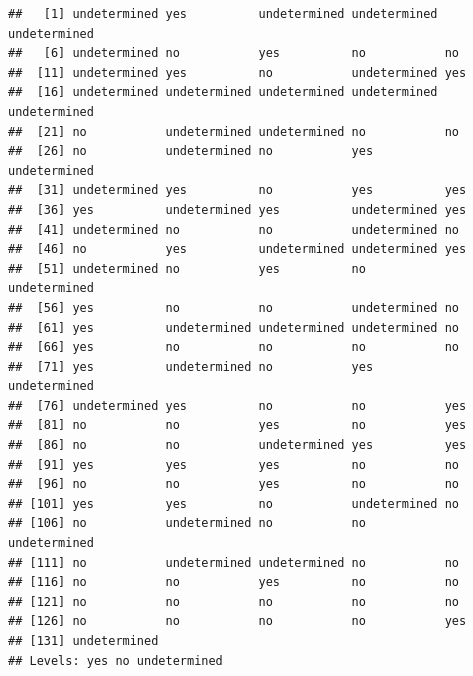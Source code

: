 \documentclass[]{book}
\newenvironment{Shaded}{\begin{snugshade}}{\end{snugshade}}
\newcommand{\KeywordTok}[1]{\textcolor[rgb]{0.13,0.29,0.53}{\textbf{#1}}}
\newcommand{\DataTypeTok}[1]{\textcolor[rgb]{0.13,0.29,0.53}{#1}}
\newcommand{\StringTok}[1]{\textcolor[rgb]{0.31,0.60,0.02}{#1}}
\newcommand{\OperatorTok}[1]{\textcolor[rgb]{0.81,0.36,0.00}{\textbf{#1}}}
\newcommand{\NormalTok}[1]{#1}
\begin{document}
\begin{Shaded}
\end{Shaded}

\begin{verbatim}
##   [1] undetermined yes          undetermined undetermined undetermined
##   [6] undetermined no           yes          no           no          
##  [11] undetermined yes          no           undetermined yes         
##  [16] undetermined undetermined undetermined undetermined undetermined
##  [21] no           undetermined undetermined no           no          
##  [26] no           undetermined no           yes          undetermined
##  [31] undetermined yes          no           yes          yes         
##  [36] yes          undetermined yes          undetermined yes         
##  [41] undetermined no           no           undetermined no          
##  [46] no           yes          undetermined undetermined yes         
##  [51] undetermined no           yes          no           undetermined
##  [56] yes          no           no           undetermined no          
##  [61] yes          undetermined undetermined undetermined no          
##  [66] yes          no           no           no           no          
##  [71] yes          undetermined no           yes          undetermined
##  [76] undetermined yes          no           no           yes         
##  [81] no           no           yes          no           yes         
##  [86] no           no           undetermined yes          yes         
##  [91] yes          yes          yes          no           no          
##  [96] no           no           yes          no           no          
## [101] yes          yes          no           undetermined no          
## [106] no           undetermined no           no           undetermined
## [111] no           undetermined undetermined no           no          
## [116] no           no           yes          no           no          
## [121] no           no           no           no           no          
## [126] no           no           no           no           yes         
## [131] undetermined
## Levels: yes no undetermined
\end{verbatim}
\end{document}
